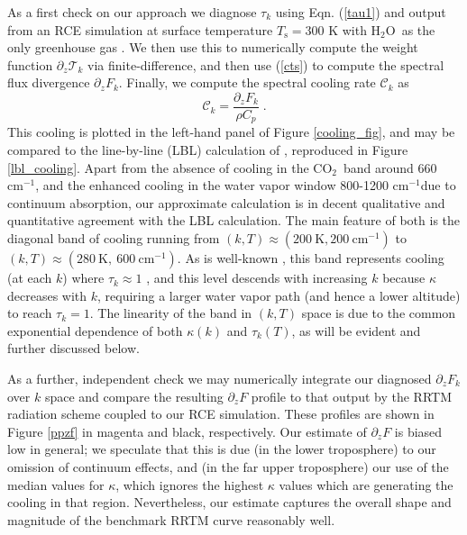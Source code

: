 \documentclass[10pt]{article}
\newcommand{\beqn}{\begin{equation}}
\newcommand{\eeqn}{\end{equation}}
\newcommand{\eqnref}[1]{(\ref{#1})}
\newcommand{\ppz}{\ensuremath{\partial_z}}
\newcommand{\cotwo}{\ensuremath{\mathrm{CO_2}}}
\newcommand{\htwo}{\ensuremath{\mathrm{H_2O}}}
\newcommand{\FLW}{\ensuremath{F}}
\newcommand{\trans}{\ensuremath{\mathcal{T}}}
\newcommand{\cool}{\ensuremath{\mathcal{C}}}
\newcommand{\cminverse}{\ensuremath{\mathrm{cm^{-1}}}}
\newcommand{\Ts}{\ensuremath{T_\mathrm{s}}}
\begin{document}
As a first check on our approach we diagnose $\tau_k$ using Eqn. \eqnref{tau1} and output from an RCE simulation at surface temperature $\Ts=300$ K with \htwo\ as the only greenhouse gas .  We then use this to numerically compute the weight function $\ppz\trans_k$ via finite-difference, and then use \eqnref{cts} to compute the spectral flux divergence $\ppz \FLW_k$. Finally, we  compute the spectral cooling rate $\cool_k$ as 
	\beqn
		\cool_k  = \frac{\ppz \FLW_k}{\rho C_p} \; .   \label{cooling_eqn}
	\eeqn
This cooling is plotted in the left-hand panel of Figure \ref{cooling_fig}, and  may be compared to the line-by-line (LBL) calculation of \cite{huang2013}, reproduced in Figure \ref{lbl_cooling}. Apart from the absence of cooling in the  \cotwo\ band around 660 \cminverse, and the enhanced cooling in the water vapor window 800-1200 \cminverse due to continuum absorption, our approximate calculation is in decent qualitative and quantitative agreement with the LBL calculation. The main feature of both is  the diagonal band of cooling running from 
$(k,T) \approx (200\ \mathrm{K} ,200\ \cminverse) $ to $(k,T) \approx (280\ \mathrm{K},\ 600\  \cminverse)$. As is well-known \citep[e.g.][]{goldblatt2013}, this band represents cooling (at each $k$) where  $\tau_k\approx 1$ \citep[e.g.,][]{wallace2006}, and this level descends with increasing $k$ because $\kappa$ decreases with $k$, requiring a larger water vapor path (and hence a lower altitude) to reach $\tau_k=1$. The linearity of the band in $(k,T)$ space is due to the common exponential dependence of both $\kappa(k)$ and $\tau_k(T)$, as will be evident and further discussed below.

As a further, independent check we may numerically integrate our diagnosed $\ppz \FLW_k$ over $k$ space and compare the resulting $\ppz F$ profile to that output by the RRTM radiation scheme coupled to our RCE simulation. These profiles are shown in Figure
\ref{ppzf} in magenta and black, respectively. Our estimate of $\ppz \FLW$ is biased low in general; we speculate that this is due (in the lower troposphere) to our omission of continuum effects, and (in the far upper troposphere) our use of the median values for $\kappa$, which ignores the highest $\kappa$ values which are generating the cooling in that region. Nevertheless, our estimate captures the overall shape and magnitude of the benchmark RRTM curve reasonably well.
\end{document}
